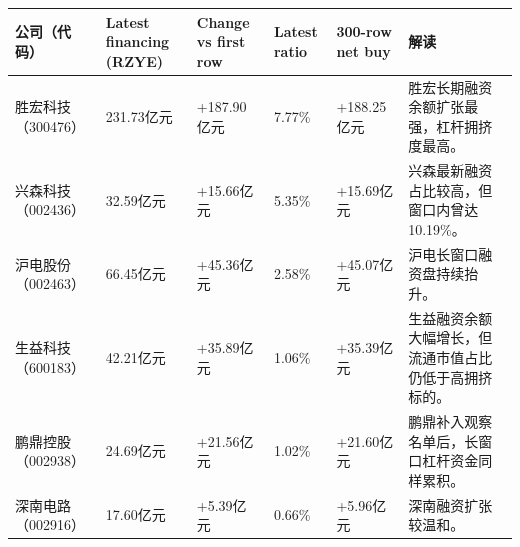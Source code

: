 \begin{exhibitbox}
\footnotesize
\begin{tabularx}{\textwidth}{L{1.7cm}R{1.8cm}R{1.9cm}R{1.5cm}R{1.8cm}X}
\toprule
\textbf{公司（代码）} & \textbf{Latest financing (RZYE)} & \textbf{Change vs first row} & \textbf{Latest ratio} & \textbf{300-row net buy} & \textbf{解读} \\
\midrule
胜宏科技（300476） & 231.73亿元 & +187.90亿元 & 7.77\% & +188.25亿元 & 胜宏长期融资余额扩张最强，杠杆拥挤度最高。 \\
兴森科技（002436） & 32.59亿元 & +15.66亿元 & 5.35\% & +15.69亿元 & 兴森最新融资占比较高，但窗口内曾达10.19\%。 \\
沪电股份（002463） & 66.45亿元 & +45.36亿元 & 2.58\% & +45.07亿元 & 沪电长窗口融资盘持续抬升。 \\
生益科技（600183） & 42.21亿元 & +35.89亿元 & 1.06\% & +35.39亿元 & 生益融资余额大幅增长，但流通市值占比仍低于高拥挤标的。 \\
鹏鼎控股（002938） & 24.69亿元 & +21.56亿元 & 1.02\% & +21.60亿元 & 鹏鼎补入观察名单后，长窗口杠杆资金同样累积。 \\
深南电路（002916） & 17.60亿元 & +5.39亿元 & 0.66\% & +5.96亿元 & 深南融资扩张较温和。 \\
\bottomrule
\end{tabularx}
\end{exhibitbox}

